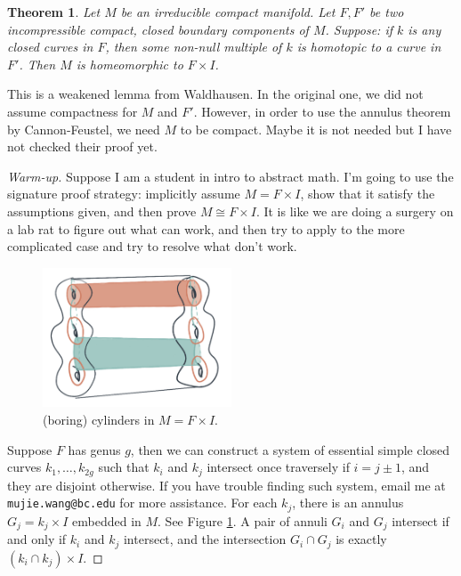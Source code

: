 \documentclass[12pt]{amsart}
\newtheorem{sat}{Theorem}[section]		\newtheorem{lem}[sat]{Lemma}
\theoremstyle{remark}
\begin{document}
\begin{sat}
	Let \(M\) be an irreducible compact manifold. Let \(F, F'\) be two incompressible compact, closed boundary components of \(M\). Suppose: if \(k\) is any closed curves in \(F\), then some non-null multiple of \(k\) is homotopic to a curve in \(F'\). Then \(M\) is homeomorphic to \(F\times I\).
\end{sat}

This is a weakened lemma from Waldhausen. In the original one, we did not assume compactness for \(M\) and \(F'\). However, in order to use the annulus theorem by Cannon-Feustel, we need \(M\) to be compact. Maybe it is not needed but I have not checked their proof yet.


\begin{proof}[Warm-up]
	 Suppose I am a student in intro to abstract math. I'm going to use the signature proof strategy: implicitly assume \(M = F \times I\), show that it satisfy the assumptions given, and then prove \(M \cong F \times I\). It is like we are doing a surgery on a lab rat to figure out what can work, and then try to apply to the more complicated case and try to resolve what don't work.
	 \begin{figure}[h!]
		\centering
		\includegraphics[width = 0.5\textwidth]{IMG1.png}
	 	\caption{(boring) cylinders in \(M = F\times I\).}
	 	\label{fig:cylinders}
	 \end{figure}

	 Suppose \(F\) has genus \(g\), then we can construct a system of essential simple closed curves \(k_1, \ldots, k_{2g}\) such that \(k_i\) and \(k_j\) intersect once traversely if \(i = j \pm 1\), and they are disjoint otherwise. If you have trouble finding such system, email me at \texttt{mujie.wang@bc.edu} for more assistance. For each \(k_j\), there is an annulus \(G_j = k_j \times I\) embedded in \(M\). See Figure \ref{fig:cylinders}. A pair of annuli \(G_i\) and \(G_j\) intersect if and only if \(k_i\) and \(k_j\) intersect, and the intersection \(G_i \cap G_j\) is exactly \((k_i \cap k_j)\times I\). 


\end{proof}
\end{document}
